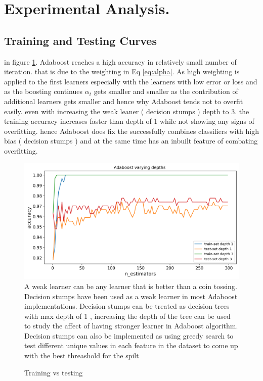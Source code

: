 \documentclass[10pt,twocolumn,letterpaper]{article}
\begin{document}
\section{Experimental Analysis.}

\subsection{Training and Testing Curves}
in figure \ref{fig:tr vs te}. Adaboost reaches a high accuracy in relatively small number of iteration. that is due to the weighting in Eq \ref{eq:alpha}. As high weighting is applied to the first learners especially with the learners with low error or loss and as the boosting continues $\alpha_{t}$ gets smaller and smaller as the contribution of additional learners gets smaller and hence why Adaboost tends not to overfit easily. even with increasing the weak leaner ( decision stumps ) depth to 3. the training accuracy increases faster than depth of 1 while not showing any signs of overfitting. hence Adaboost does fix the successfully combines classifiers with high bias ( decision stumps ) and at the same time has an inbuilt feature of combating overfitting.

  

\begin{figure}[htb]
  \includegraphics[width=\linewidth]{Adaboost_depth_2.png}A weak learner can be any learner that is better than a coin tossing. Decision stumps have been used as a weak learner in most Adaboost implementations. Decision stumps can be treated as decision trees with max depth of 1 , increasing the depth of the tree can be used to study the affect of having stronger learner in Adaboost algorithm. Decision stumps can also be implemented as using greedy search to test different unique values in each feature in the dataset to come up with the best threashold for the spilt 

  \caption{Training vs testing}
  \label{fig:tr vs te}
\end{figure}
\end{document}
